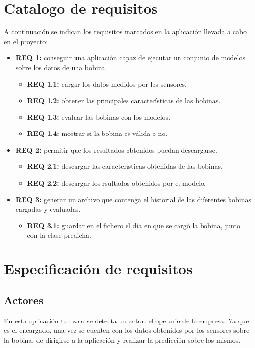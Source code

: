 \section{Catalogo de requisitos}
A continuación se indican los requisitos marcados en la aplicación llevada a cabo en el proyecto:
\begin{itemize}
    \item \textbf{REQ 1:} conseguir una aplicación capaz de ejecutar un conjunto de modelos sobre los datos de una bobina.
    \begin{itemize}
        \item \textbf{REQ 1.1:} cargar los datos medidos por los sensores.
        \item \textbf{REQ 1.2:} obtener las principales características de las bobinas.
        \item \textbf{REQ 1.3:} evaluar las bobinas con los modelos.
        \item \textbf{REQ 1.4:} mostrar si la bobina es válida o no.
    \end{itemize}
     \item \textbf{REQ 2:} permitir que los resultados obtenidos puedan descargarse.
    \begin{itemize}
        \item \textbf{REQ 2.1:} descargar las características obtenidas de las bobinas.
        \item \textbf{REQ 2.2:} descargar los rsultados obtenidos por el modelo.
    \end{itemize}
    \item \textbf{REQ 3:} generar un archivo que contenga el historial de las diferentes bobinas cargadas y evaluadas.
        \begin{itemize}
            \item \textbf{REQ 3.1:} guardar en el fichero el día en que se cargó la bobina, junto con la clase predicha.
        \end{itemize}
\end{itemize}

\section{Especificación de requisitos}
\subsection{Actores}
En esta aplicación tan solo se detecta un actor: el operario de la empresa. Ya que es el encargado, una vez se cuenten con los datos obtenidos por los sensores sobre la bobina, de dirigirse a la aplicación y realizar la predicción sobre los mismos.

